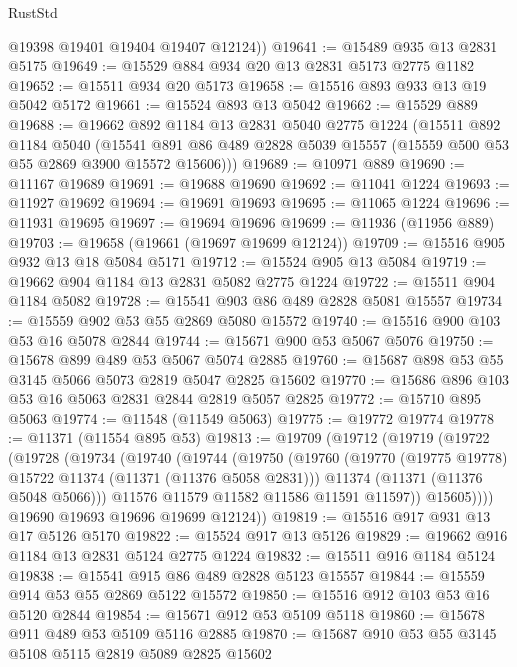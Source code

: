 \begin{lexlean}{RustStd}
\begin{coremodule}
{\begin{coremodule}
{{{{{{{{{{{{{{{{{{{{{{{{{{{{{{{{{        @19398
        @19401
        @19404
        @19407
        @12124))
@19641 := @15489 @935 @13 @2831 @5175
@19649 := @15529 @884 @934 @20 @13 @2831 @5173 @2775 @1182
@19652 := @15511 @934 @20 @5173
@19658 := @15516 @893 @933 @13 @19 @5042 @5172
@19661 := @15524 @893 @13 @5042
@19662 := @15529 @889
@19688 := @19662
    @892
    @1184
    @13
    @2831
    @5040
    @2775
    @1224
    (@15511
      @892
      @1184
      @5040
      (@15541 @891 @86 @489 @2828 @5039 @15557 (@15559 @500 @53 @55 @2869 @3900 @15572 @15606)))
@19689 := @10971 @889
@19690 := @11167 @19689
@19691 := @19688 @19690
@19692 := @11041 @1224
@19693 := @11927 @19692
@19694 := @19691 @19693
@19695 := @11065 @1224
@19696 := @11931 @19695
@19697 := @19694 @19696
@19699 := @11936 (@11956 @889)
@19703 := @19658 (@19661 (@19697 @19699 @12124))
@19709 := @15516 @905 @932 @13 @18 @5084 @5171
@19712 := @15524 @905 @13 @5084
@19719 := @19662 @904 @1184 @13 @2831 @5082 @2775 @1224
@19722 := @15511 @904 @1184 @5082
@19728 := @15541 @903 @86 @489 @2828 @5081 @15557
@19734 := @15559 @902 @53 @55 @2869 @5080 @15572
@19740 := @15516 @900 @103 @53 @16 @5078 @2844
@19744 := @15671 @900 @53 @5067 @5076
@19750 := @15678 @899 @489 @53 @5067 @5074 @2885
@19760 := @15687 @898 @53 @55 @3145 @5066 @5073 @2819 @5047 @2825 @15602
@19770 := @15686 @896 @103 @53 @16 @5063 @2831 @2844 @2819 @5057 @2825
@19772 := @15710 @895 @5063
@19774 := @11548 (@11549 @5063)
@19775 := @19772 @19774
@19778 := @11371 (@11554 @895 @53)
@19813 := @19709
    (@19712
      (@19719
        (@19722
          (@19728
            (@19734
              (@19740
                (@19744
                  (@19750
                    (@19760
                      (@19770 (@19775 @19778) @15722 @11374 (@11371 (@11376 @5058 @2831)))
                      @11374
                      (@11371 (@11376 @5048 @5066)))
                    @11576
                    @11579
                    @11582
                    @11586
                    @11591
                    @11597))
                @15605))))
        @19690
        @19693
        @19696
        @19699
        @12124))
@19819 := @15516 @917 @931 @13 @17 @5126 @5170
@19822 := @15524 @917 @13 @5126
@19829 := @19662 @916 @1184 @13 @2831 @5124 @2775 @1224
@19832 := @15511 @916 @1184 @5124
@19838 := @15541 @915 @86 @489 @2828 @5123 @15557
@19844 := @15559 @914 @53 @55 @2869 @5122 @15572
@19850 := @15516 @912 @103 @53 @16 @5120 @2844
@19854 := @15671 @912 @53 @5109 @5118
@19860 := @15678 @911 @489 @53 @5109 @5116 @2885
@19870 := @15687 @910 @53 @55 @3145 @5108 @5115 @2819 @5089 @2825 @15602
}}}}}}}}}}}}}}}}}}}}}}}}}}}}}}}}}
\end{coremodule}}
\end{coremodule}
\end{lexlean}
